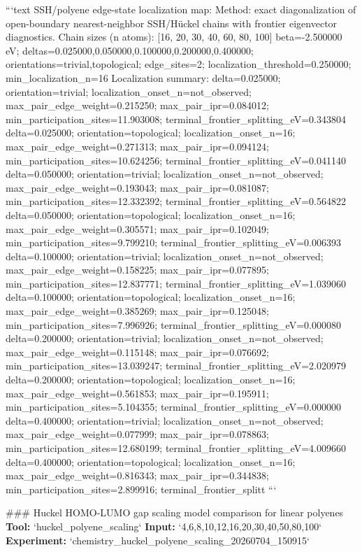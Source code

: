 \documentclass[11pt,a4paper]{article}
\begin{document}
```text
SSH/polyene edge-state localization map:
  Method: exact diagonalization of open-boundary nearest-neighbor SSH/Hückel chains with frontier eigenvector diagnostics.
  Chain sizes (n atoms): [16, 20, 30, 40, 60, 80, 100]
  beta=-2.500000 eV; deltas=0.025000,0.050000,0.100000,0.200000,0.400000; orientations=trivial,topological; edge\_sites=2; localization\_threshold=0.250000; min\_localization\_n=16
  Localization summary:
  delta=0.025000; orientation=trivial; localization\_onset\_n=not\_observed; max\_pair\_edge\_weight=0.215250; max\_pair\_ipr=0.084012; min\_participation\_sites=11.903008; terminal\_frontier\_splitting\_eV=0.343804
  delta=0.025000; orientation=topological; localization\_onset\_n=16; max\_pair\_edge\_weight=0.271313; max\_pair\_ipr=0.094124; min\_participation\_sites=10.624256; terminal\_frontier\_splitting\_eV=0.041140
  delta=0.050000; orientation=trivial; localization\_onset\_n=not\_observed; max\_pair\_edge\_weight=0.193043; max\_pair\_ipr=0.081087; min\_participation\_sites=12.332392; terminal\_frontier\_splitting\_eV=0.564822
  delta=0.050000; orientation=topological; localization\_onset\_n=16; max\_pair\_edge\_weight=0.305571; max\_pair\_ipr=0.102049; min\_participation\_sites=9.799210; terminal\_frontier\_splitting\_eV=0.006393
  delta=0.100000; orientation=trivial; localization\_onset\_n=not\_observed; max\_pair\_edge\_weight=0.158225; max\_pair\_ipr=0.077895; min\_participation\_sites=12.837771; terminal\_frontier\_splitting\_eV=1.039060
  delta=0.100000; orientation=topological; localization\_onset\_n=16; max\_pair\_edge\_weight=0.385269; max\_pair\_ipr=0.125048; min\_participation\_sites=7.996926; terminal\_frontier\_splitting\_eV=0.000080
  delta=0.200000; orientation=trivial; localization\_onset\_n=not\_observed; max\_pair\_edge\_weight=0.115148; max\_pair\_ipr=0.076692; min\_participation\_sites=13.039247; terminal\_frontier\_splitting\_eV=2.020979
  delta=0.200000; orientation=topological; localization\_onset\_n=16; max\_pair\_edge\_weight=0.561853; max\_pair\_ipr=0.195911; min\_participation\_sites=5.104355; terminal\_frontier\_splitting\_eV=0.000000
  delta=0.400000; orientation=trivial; localization\_onset\_n=not\_observed; max\_pair\_edge\_weight=0.077999; max\_pair\_ipr=0.078863; min\_participation\_sites=12.680199; terminal\_frontier\_splitting\_eV=4.009660
  delta=0.400000; orientation=topological; localization\_onset\_n=16; max\_pair\_edge\_weight=0.816343; max\_pair\_ipr=0.344838; min\_participation\_sites=2.899916; terminal\_frontier\_splitt
```

\#\#\# Huckel HOMO-LUMO gap scaling model comparison for linear polyenes
\textbf{Tool:} `huckel\_polyene\_scaling`
\textbf{Input:} `4,6,8,10,12,16,20,30,40,50,80,100`
\textbf{Experiment:} `chemistry\_huckel\_polyene\_scaling\_20260704\_150915`
\end{document}

